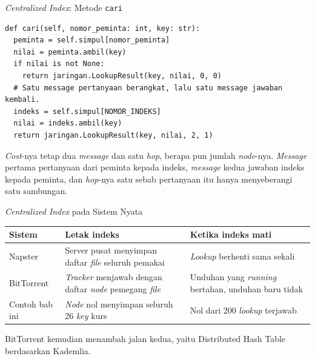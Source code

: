 \documentclass[aspectratio=169, table, 12pt]{beamer}
\begin{document}
\begin{frame}[fragile]{{\Large \textit{Centralized Index}: Metode \texttt{cari}}}
  \vspace{4pt}
\begin{lstlisting}[style=PythonStyle]
def cari(self, nomor_peminta: int, key: str):
  peminta = self.simpul[nomor_peminta]
  nilai = peminta.ambil(key)
  if nilai is not None:
    return jaringan.LookupResult(key, nilai, 0, 0)
  # Satu message pertanyaan berangkat, lalu satu message jawaban kembali.
  indeks = self.simpul[NOMOR_INDEKS]
  nilai = indeks.ambil(key)
  return jaringan.LookupResult(key, nilai, 2, 1)
\end{lstlisting}
  \vspace{4pt}
  {\small \textit{Cost}-nya tetap dua \textit{message} dan satu \textit{hop}, berapa pun jumlah
  \textit{node}-nya. \textit{Message} pertama pertanyaan dari peminta kepada indeks, \textit{message}
  kedua jawaban indeks kepada peminta, dan \textit{hop}-nya satu sebab
  pertanyaan itu hanya menyeberangi satu sambungan.}
\end{frame}

\begin{frame}{{\Large \textit{Centralized Index} pada Sistem Nyata}}
  \vspace{8pt}
  \centering
  \small
  \begin{tabularx}{0.95\textwidth}{|l|X|X|}
    \hline
    \textbf{Sistem} & \textbf{Letak indeks} & \textbf{Ketika indeks mati} \\
    \hline
    Napster & Server pusat menyimpan daftar \textit{file} seluruh pemakai & \textit{Lookup} berhenti sama sekali \\
    \hline
    BitTorrent & \textit{Tracker} menjawab dengan daftar \textit{node} pemegang \textit{file} & Unduhan yang \textit{running} bertahan, unduhan baru tidak \\
    \hline
    Contoh bab ini & \textit{Node} nol menyimpan seluruh 26 \textit{key} kurs & Nol dari 200 \textit{lookup} terjawab \\
    \hline
  \end{tabularx}

  \vspace{8pt}
  {\small BitTorrent kemudian menambah jalan kedua, yaitu Distributed Hash
  Table berdasarkan Kademlia.}
\end{frame}
\end{document}
